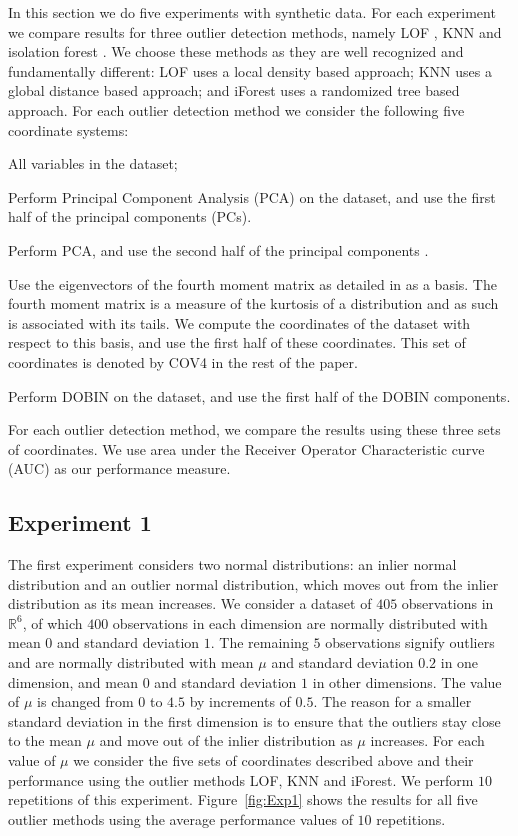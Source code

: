 \documentclass[letter,12pt]{article}
\begin{document}
In this section we do {\color{blue} five} experiments with synthetic data. For each experiment we compare results for three outlier detection methods, namely LOF \citep{breunig2000lof}, KNN \citep{ramaswamy2000efficient} and isolation forest \citep{liu2008isolation}. We choose these methods as they are well recognized and fundamentally different: LOF uses a local density based approach; KNN uses a global distance based approach; and iForest uses a randomized tree based approach. For each outlier detection method we consider the following {\color{blue} five} coordinate systems:
\begin{enumerate}
	\item All variables in the dataset;
	\item Perform Principal Component Analysis (PCA) on the dataset, and use the first half of the principal components (PCs).
	{\color{blue} \item Perform PCA, and use the second half of the principal components \citep{amnarttrakul2011new}. 
	\item Use the eigenvectors of the fourth moment matrix as detailed in \cite{tyler2009invariant} as a basis. The fourth moment matrix is a measure of the kurtosis of a distribution and as such is associated with its tails.  We compute the coordinates of the dataset with respect to this basis, and use the first half of these coordinates. This set of coordinates is denoted by COV4 in the rest of the paper.  }
	\item Perform DOBIN on the dataset, and use the first half of the DOBIN components.
\end{enumerate}
For each outlier detection method, we compare the results using these three sets of coordinates. We use area under the Receiver Operator Characteristic curve (AUC) as our performance measure.

\subsection{Experiment 1}

The first experiment considers two normal distributions: an inlier normal distribution and an outlier normal distribution, which moves out from the inlier distribution as its mean increases. We consider a dataset of $405$ observations in $\mathbb{R}^6$, of which $400$ observations in each dimension are normally distributed with mean $0$ and standard deviation $1$. The remaining $5$ observations signify outliers and are normally distributed with mean $\mu$ and standard deviation $0.2$ in one dimension, and mean $0$ and standard deviation $1$ in other dimensions. The value of $\mu$ is changed from $0$ to $4.5$ by increments of $0.5$. The reason for a smaller standard deviation in the first dimension is to ensure that the outliers stay close to the mean $\mu$ and move out of the inlier distribution as $\mu$ increases. For each value of $\mu$ we consider the {\color{blue} five}  sets of coordinates described above and their performance using the outlier methods LOF, KNN and iForest. We perform $10$ repetitions of this experiment. Figure~\ref{fig:Exp1} shows the results for all {\color{blue} five} outlier methods using the average performance values of $10$ repetitions.
\end{document}
